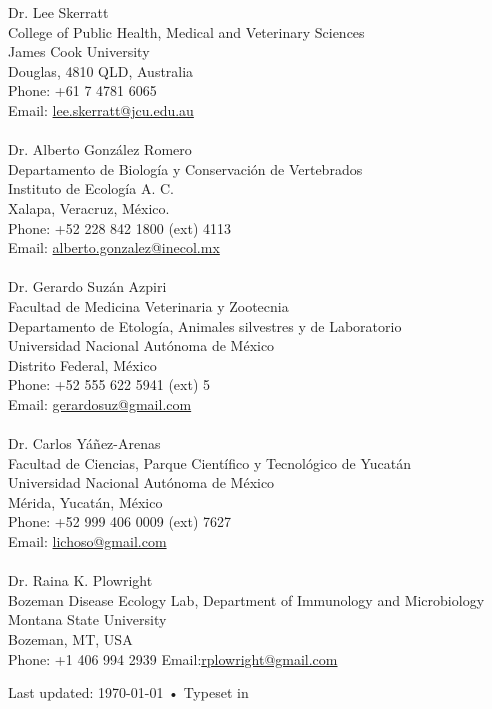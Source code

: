 \documentclass[12pt, a4paper]{article}
\begin{document}
Dr. Lee Skerratt\\
College of Public Health, Medical and Veterinary Sciences \\
James Cook University\\
Douglas, 4810 QLD, Australia\\
Phone: +61 7 4781 6065\\
Email: \href{mailto:lee.skerratt@jcu.edu.au}{lee.skerratt@jcu.edu.au}\\
\\
Dr. Alberto Gonz\'alez Romero\\
Departamento de Biolog\'ia y Conservaci\'on de Vertebrados \\
Instituto de Ecolog\'ia A. C.\\
Xalapa, Veracruz, M\'exico.\\
Phone: +52 228 842 1800 (ext) 4113\\
Email: \href{mailto:alberto.gonzalez@inecol.mx}{alberto.gonzalez@inecol.mx}\\
\\
Dr. Gerardo Suz\'an Azpiri\\
Facultad de Medicina Veterinaria y Zootecnia\\
Departamento de Etolog\'ia, Animales silvestres y de Laboratorio\\
Universidad Nacional Aut\'onoma de M\'exico\\
Distrito Federal, M\'exico\\
Phone: +52 555 622 5941 (ext) 5\\
Email: \href{mailto:gerardosuz@gmail.com}{gerardosuz@gmail.com}\\
\\
Dr. Carlos Y\'a\~nez-Arenas\\
Facultad de Ciencias, Parque Cient\'ifico y Tecnol\'ogico de Yucat\'an\\
Universidad Nacional Aut\'onoma de M\'exico\\
M\'erida, Yucat\'an, M\'exico\\
Phone: +52 999 406 0009 (ext) 7627\\
Email: \href{mailto:lichoso@gmail.com}{lichoso@gmail.com}\\
\\
Dr. Raina K. Plowright\\
Bozeman Disease Ecology Lab, Department of Immunology and Microbiology\\
Montana State University\\
Bozeman, MT, USA\\
Phone: +1 406 994 2939
Email:\href{mailto:rplowright@gmail.com}{rplowright@gmail.com} 
\vfill{}
\begin{center}
{\scriptsize  Last updated: \today\- •\- 
Typeset in %
\XeTeX %
}
\end{center}
\end{document}
